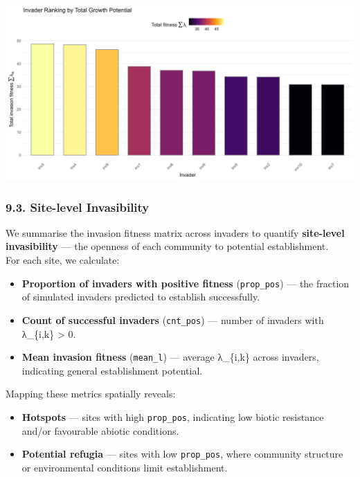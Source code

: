 \documentclass[
]{article}
\providecommand{\tightlist}{%
  \setlength{\itemsep}{0pt}\setlength{\parskip}{0pt}}
\begin{document}
\includegraphics[width=1\linewidth]{man/figures/README-invader-rank-1}

\hypertarget{site-level-invasibility}{%
\subsubsection{9.3. Site-level
Invasibility}\label{site-level-invasibility}}

We summarise the invasion fitness matrix across invaders to quantify
\textbf{site-level invasibility} --- the openness of each community to
potential establishment.\\
For each site, we calculate:

\begin{itemize}
\tightlist
\item
  \textbf{Proportion of invaders with positive fitness}
  (\texttt{prop\_pos}) --- the fraction of simulated invaders predicted
  to establish successfully.\\
\item
  \textbf{Count of successful invaders} (\texttt{cnt\_pos}) --- number
  of invaders with λ\_\{i,k\} \textgreater{} 0.\\
\item
  \textbf{Mean invasion fitness} (\texttt{mean\_l}) --- average
  λ\_\{i,k\} across invaders, indicating general establishment
  potential.
\end{itemize}

Mapping these metrics spatially reveals:

\begin{itemize}
\tightlist
\item
  \textbf{Hotspots} --- sites with high \texttt{prop\_pos}, indicating
  low biotic resistance and/or favourable abiotic conditions.\\
\item
  \textbf{Potential refugia} --- sites with low \texttt{prop\_pos},
  where community structure or environmental conditions limit
  establishment.
\end{itemize}
\end{document}
